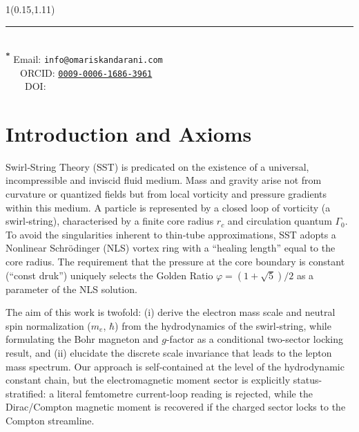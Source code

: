 \documentclass[11pt]{article}
\newcommand{\rc}{r_c}                                    %
\newcommand{\GammaSST}{\Gamma_0}                         %
\newcommand{\phiG}{\varphi}
\begin{document}
\begin{textblock*}{1\textwidth}(0.15\textwidth,1.11\textheight)
    \raggedright\footnotesize
    \renewcommand{\arraystretch}{1.0}
    \noindent\rule{\textwidth}{0.4pt}\\[0.5em]
    \textsuperscript{\textbf{*}} Email: \texttt{info@omariskandarani.com}\\
    \ \ \ ORCID: \texttt{\href{https://orcid.org/0009-0006-1686-3961}{0009-0006-1686-3961}}  \\
    \ \ \ \ DOI: \href{https://doi.org/\paperdoi}{\paperdoi}
\end{textblock*}

\section{Introduction and Axioms}
\label{sec:introduction}

Swirl‑String Theory (SST) is predicated on the existence of a universal, incompressible and inviscid fluid medium.  Mass and gravity arise not from curvature or quantized fields but from local vorticity and pressure gradients within this medium.  A particle is represented by a closed loop of vorticity (a swirl‑string), characterised by a finite core radius $\rc$ and circulation quantum $\GammaSST$.  To avoid the singularities inherent to thin‑tube approximations, SST adopts a Nonlinear Schrödinger (NLS) vortex ring with a ``healing length'' equal to the core radius.  The requirement that the pressure at the core boundary is constant (``const druk'') uniquely selects the Golden Ratio $\phiG=(1+\sqrt{5})/2$ as a parameter of the NLS solution.

The aim of this work is twofold: (i) derive the electron mass scale and neutral spin normalization ($m_e$, $\hbar$) from the hydrodynamics of the swirl‑string, while formulating the Bohr magneton and $g$-factor as a conditional two-sector locking result, and (ii) elucidate the discrete scale invariance that leads to the lepton mass spectrum.  Our approach is self‑contained at the level of the hydrodynamic constant chain, but the electromagnetic moment sector is explicitly status-stratified: a literal femtometre current-loop reading is rejected, while the Dirac/Compton magnetic moment is recovered if the charged sector locks to the Compton streamline.
\end{document}
